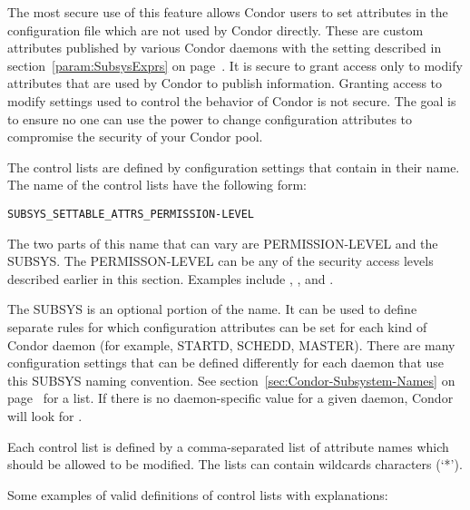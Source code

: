 The most secure use of this feature allows Condor users to set
attributes in the configuration file which are not used by Condor
directly.
These are custom attributes published by various Condor
daemons with the  setting described in
section~\ref{param:SubsysExprs} on page~\pageref{param:SubsysExprs}.
It is secure to grant access only to modify attributes that are used by Condor
to publish information.
Granting access to modify
settings used to control the behavior of Condor is
not secure.
The goal is to
ensure no
one can use the power to change configuration attributes to compromise 
the security of your Condor pool.

The control lists are defined by configuration settings that contain 
 in their name.
The name of the control lists have the following form: 

\begin{verbatim}
SUBSYS_SETTABLE_ATTRS_PERMISSION-LEVEL
\end{verbatim}

The two parts of this name that can vary are
PERMISSION-LEVEL and the SUBSYS.
The PERMISSON-LEVEL can be any of the security access levels
described earlier in this section.
Examples include , , and .

The SUBSYS is an optional portion of the name. 
It can be used to
define separate rules for which configuration attributes can be set
for each kind of Condor daemon (for example, STARTD, SCHEDD, MASTER).
There are many configuration settings that can be defined differently
for each daemon that use this SUBSYS naming convention.
See section~\ref{sec:Condor-Subsystem-Names} on
page~\pageref{sec:Condor-Subsystem-Names} for a list.
If there is no daemon-specific value for a given daemon, Condor will
look for .

Each control list is defined by a comma-separated list of attribute
names which should be allowed to be modified.
The lists can contain wildcards characters (`*'). 

Some examples of valid definitions of control lists with explanations:

